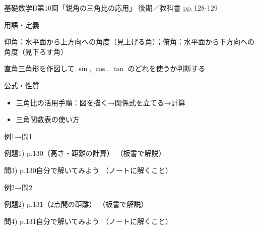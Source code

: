 \documentclass[aspectratio=43,professionalfonts,handout]{beamer}
\newcommand{\LectureNum}{10}
\newcommand{\LectureTitle}{鋭角の三角比の応用}
\newcommand{\TextPages}{pp.\,128-129}
\newcommand{\CourseName}{基礎数学B}
\renewcommand{\TermName}{後期}
\begin{document}
\begin{frame}{\CourseName\quad 第\LectureNum 回「\LectureTitle 」}
  {\small \TermName\quad \TeacherName\quad ／\quad 教科書 \TextPages}

  \begin{block}{用語・定義}
  \begin{description}[labelwidth=5.5em]
    \item[\kw{仰角・俯角}] 仰角：水平面から上方向への角度（見上げる角）；俯角：水平面から下方向への角度（見下ろす角）
    \item[\kw{三角比の応用（距離・高さを求める）}] 直角三角形を作図して $\sin$, $\cos$, $\tan$ のどれを使うか判断する
  \end{description}
  \end{block}
\end{frame}

\begin{frame}{公式・性質}
  \begin{block}{}
  \begin{itemize}
    \item 三角比の活用手順：図を描く→関係式を立てる→計算
    \item 三角関数表の使い方
  \end{itemize}
  \end{block}
\end{frame}

\begin{frame}{例1→問1}
  \begin{exampleblock}{例題1) p.130（高さ・距離の計算）}
    （板書で解説）
  \end{exampleblock}

  \vfill

  \begin{block}{問3) p.130\quad 自分で解いてみよう}
    （ノートに解くこと）
  \end{block}
\end{frame}

\begin{frame}{例2→問2}
  \begin{exampleblock}{例題2) p.131（2点間の距離）}
    （板書で解説）
  \end{exampleblock}

  \vfill

  \begin{block}{問4) p.131\quad 自分で解いてみよう}
    （ノートに解くこと）
  \end{block}
\end{frame}
\end{document}
